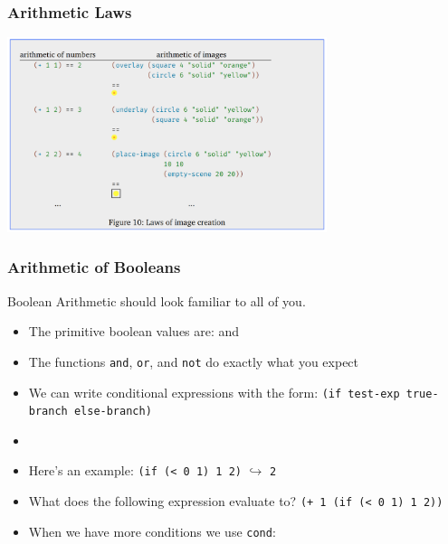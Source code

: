 \documentclass{beamer}
\begin{document}
\begin{frame}
  \frametitle{Arithmetic Laws}
  \begin{center}
    \includegraphics[width=0.7\textwidth]{images/Arithmetic-Images.png}
  \end{center}
\end{frame}



\begin{frame}
  \frametitle{Arithmetic of Booleans}
  Boolean Arithmetic should look familiar to all of you.
  \begin{itemize}
  \item<2-> The primitive boolean values are: 
     and 
  \item<3-> The functions \texttt{and}, \texttt{or}, and
    \texttt{not} do exactly what you expect
  \item<4-> We can write conditional expressions with the form:
    \texttt{(if test-exp true-branch else-branch)}
  \item<5-> \item<5-> Here's an example:
    \texttt{(if (< 0 1) 1 2)} $\hookrightarrow$ \texttt{2}
  \item<5-> What does the following expression evaluate to?
    \texttt{(+ 1 (if (< 0 1) 1 2))}
  \item<6-> When we have more conditions we use \texttt{cond}:
    \cond
  \end{itemize}  
\end{frame}
\end{document}

